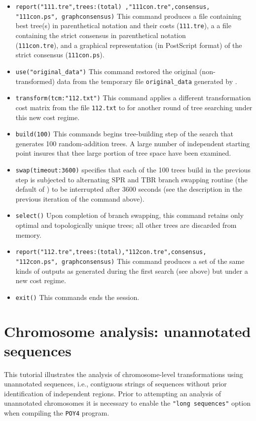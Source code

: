 \begin{itemize}
\item \texttt{report("111.tre",trees:(total) ,"111con.tre",consensus,\\"111con.ps", graphconsensus)} This command produces a file containing best tree(s) in parenthetical notation and their costs (\texttt{111.tre}), a a file containing the strict consensus in parenthetical notation \\(\texttt{111con.tre}), and a graphical representation (in PostScript format) of the strict consensus (\texttt{111con.ps}).
\item \texttt{use("original\_data")} This command restored the original (non-trans\-formed) data from the temporary file \texttt{original\_data} generated by .
\item \texttt{transform(tcm:"112.txt")} This command applies a different transformation cost matrix from the file \texttt{112.txt} to for another round of tree searching under this new cost regime.
\item \texttt{build(100)} This commands begins tree-building step of the search that generates 100 random-addition trees. A large number of independent starting point insures that thee large portion of tree space have been examined.
\item \texttt{swap(timeout:3600)}  specifies that each of the 100 trees build in the previous step is subjected to alternating SPR and TBR branch swapping routine (the default of \poy) to be interrupted after 3600 seconds (see the description in the previous iteration of the command above).
\item \texttt{select()} Upon completion of branch swapping, this command retains only optimal and topologically unique trees; all other trees are discarded from memory.
\item \texttt{report("112.tre",trees:(total),"112con.tre",consensus,\\"112con.ps", graphconsensus)} This command produces a set of the same kinds of outputs as generated during the first search (see above) but under a new cost regime.
\item \texttt{exit()} This commands ends the \poy session.
\end{itemize}

\section{Chromosome analysis: unannotated sequences}{\label{tutorial4.6}}

This tutorial illustrates the analysis of chromosome-level transformations using 
unannotated sequences, i.e., contiguous strings of sequences without prior 
identification of independent regions. Prior to attempting an analysis of  
unannotated chromosomes it is necessary to enable the \texttt {"long sequences"}
option when compiling the \texttt{POY4} program. 

